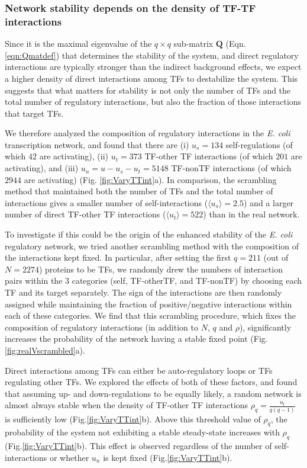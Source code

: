 \documentclass[10pt]{article}
\begin{document}
\subsubsection*{Network stability depends on the density of TF-TF interactions}

Since it is the maximal eigenvalue of the $q \times q$ sub-matrix $\mathbf{Q}$ (Eqn. \ref{eqn:Qmatdef}) that determines the stability of the system, and direct regulatory interactions are typically stronger than the indirect background effects, we expect a higher density of direct interactions among TFs to destabilize the system. This suggests that what matters for stability is not only the number of TFs and the total number of regulatory interactions, but also the fraction of those interactions that target TFs.   

We therefore analyzed the composition of regulatory interactions in the \textit{E. coli} transcription network, and found that there are (i) $u_s = 134$ self-regulations (of which $42$ are activating), (ii) $u_t = 373$ TF-other TF interactions (of which $201$ are activating), and (iii) $u_n = u - u_s - u_t = 5148$ TF-nonTF interactions (of which $2944$ are activating) (Fig. \ref{fig:VaryTTint}a). In comparison, the scrambling method that maintained both the number of TFs and the total number of interactions gives a smaller number of self-interactions ($\langle u_s \rangle = 2.5$) and a larger number of direct TF-other TF interactions ($\langle u_t \rangle = 522$) than in the real network. 

To investigate if this could be the origin of the enhanced stability of the \textit{E. coli} regulatory network, we tried another scrambling method with the composition of the interactions kept fixed. In particular, after setting the first $q=211$ (out of $N=2274$) proteins to be TFs, we randomly drew the numbers of interaction pairs within the 3 categories (self, TF-otherTF, and TF-nonTF) by choosing each TF and its target separately. The sign of the interactions are then randomly assigned while maintaining the fraction of positive/negative interactions within each of these categories. We find that this scrambling procedure, which fixes the composition of regulatory interactions (in addition to $N$, $q$ and $\rho$), significantly increases the probability of the network having a stable fixed point (Fig. \ref{fig:realVscrambled}a).

Direct interactions among TFs can either be auto-regulatory loops or TFs regulating other TFs. We explored the effects of both of these factors, and found that assuming up- and down-regulations to be equally likely, a random network is almost always stable when the density of TF-other TF interactions $\rho_q = \frac{u_t}{q(q-1)}$ is sufficiently low (Fig.\ref{fig:VaryTTint}b). Above this threshold value of $\rho_q$, the probability of the system not exhibiting a stable steady-state increases with $\rho_q$ (Fig.\ref{fig:VaryTTint}b). This effect is observed regardless of the number of self-interactions or whether $u_n$ is kept fixed (Fig.\ref{fig:VaryTTint}b). 
\end{document}
